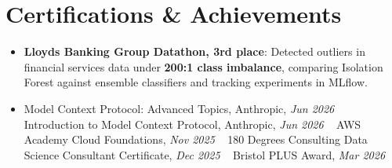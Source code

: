 \documentclass[a4paper,11pt]{article}
\newcommand{\num}[1]{\textbf{#1}}   %
\begin{document}
\section{Certifications \& Achievements}
\begin{itemize}
  \item \textbf{Lloyd\textquotesingle{}s Banking Group Datathon, 3rd place}: Detected outliers in financial services data under \num{200:1 class imbalance}, comparing Isolation Forest against ensemble classifiers and tracking experiments in MLflow.
  \item Model Context Protocol: Advanced Topics, Anthropic, \textit{Jun 2026}\nobreak\ \,\textperiodcentered\, Introduction to Model Context Protocol, Anthropic, \textit{Jun 2026}\nobreak\ \,\textperiodcentered\, AWS Academy Cloud Foundations, \textit{Nov 2025}\nobreak\ \,\textperiodcentered\, 180 Degrees Consulting Data Science Consultant Certificate, \textit{Dec 2025}\nobreak\ \,\textperiodcentered\, Bristol PLUS Award, \textit{Mar 2026}
\end{itemize}
\end{document}
